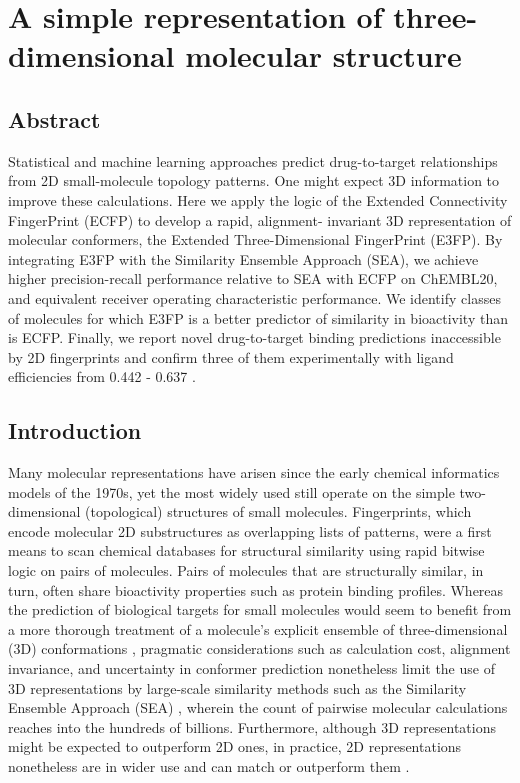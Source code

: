 \documentclass[../../main.tex]{subfiles}
\begin{document}
\chapter{A simple representation of three-dimensional molecular structure}
\label{e3fp-paper}

\begin{refsection}

	\section{Abstract}

	Statistical and machine learning approaches predict drug-to-target relationships from 2D small-molecule topology patterns.
	One might expect 3D information to improve these calculations.
	Here we apply the logic of the Extended Connectivity FingerPrint (ECFP) to develop a rapid, alignment- invariant 3D representation of molecular conformers, the Extended Three-Dimensional FingerPrint (E3FP).
	By integrating E3FP with the Similarity Ensemble Approach (SEA), we achieve higher precision-recall performance relative to SEA with ECFP on ChEMBL20, and equivalent receiver operating characteristic performance.
	We identify classes of molecules for which E3FP is a better predictor of similarity in bioactivity than is ECFP.
	Finally, we report novel drug-to-target binding predictions inaccessible by 2D fingerprints and confirm three of them experimentally with ligand efficiencies from 0.442 - 0.637 \LEunit{}.

	\section{Introduction}

	Many molecular representations have arisen since the early chemical informatics models of the 1970s, yet the most widely used still operate on the simple two-dimensional (topological) structures of small molecules.
	Fingerprints, which encode molecular 2D substructures as overlapping lists of patterns, were a first means to scan chemical databases for structural similarity using rapid bitwise logic on pairs of molecules.
	Pairs of molecules that are structurally similar, in turn, often share bioactivity properties \supercite{matter_1997} such as protein binding profiles.
	Whereas the prediction of biological targets for small molecules would seem to benefit from a more thorough treatment of a molecule's explicit ensemble of three-dimensional (3D) conformations \supercite{nicholls_2010}, pragmatic considerations such as calculation cost, alignment invariance, and uncertainty in conformer prediction \supercite{sheridan_2002} nonetheless limit the use of 3D representations by large-scale similarity methods such as the Similarity Ensemble Approach (SEA) \supercite{keiser_2007,keiser_2009}, wherein the count of pairwise molecular calculations reaches into the hundreds of billions.
	Furthermore, although 3D representations might be expected to outperform 2D ones, in practice, 2D representations nonetheless are in wider use and can match or outperform them \supercite{sheridan_2002,hert_2008,maggiora_2014,keiser_2010}.


\end{refsection}
\end{document}
